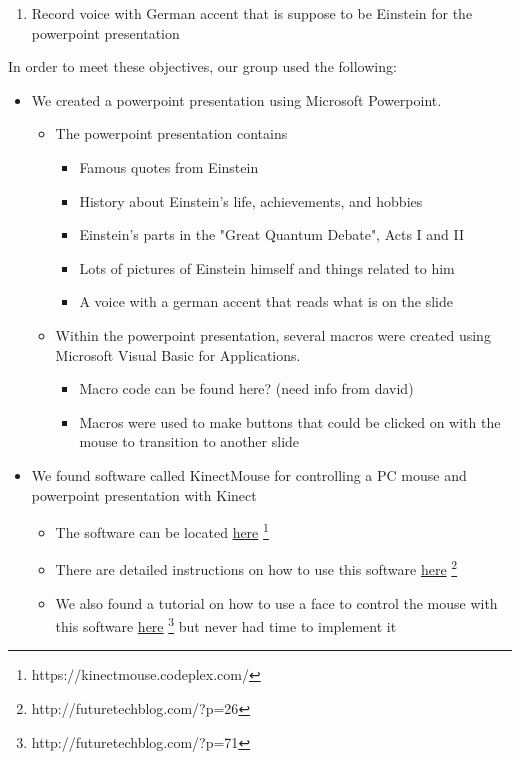 \documentclass[12pt]{article}
\begin{document}
\begin{description}
\begin{enumerate}
			\item Record voice with German accent that is suppose to be Einstein for the powerpoint presentation
		\end{enumerate}
		In order to meet these objectives, our group used the following:
		\begin{itemize}
			\item We created a powerpoint presentation using Microsoft Powerpoint.
				\begin{itemize}
					\item The powerpoint presentation contains
						\begin{itemize}
							\item Famous quotes from Einstein
							\item History about Einstein's life, achievements, and hobbies
							\item Einstein's parts in the "Great Quantum Debate", Acts I and II
							\item Lots of pictures of Einstein himself and things related to him
							\item A voice with a german accent that reads what is on the slide
						\end{itemize}
					\item Within the powerpoint presentation, several macros were created using Microsoft Visual Basic for Applications.
						\begin{itemize}
							\item Macro code can be found here? (need info from david)
							\item Macros were used to make buttons that could be clicked on with the mouse to transition to another slide
						\end{itemize}
				\end{itemize}
			\item We found software called KinectMouse for controlling a PC mouse and powerpoint presentation with Kinect
				\begin{itemize}
					\item The software can be located \href{https://kinectmouse.codeplex.com/}{here} \footnote{https://kinectmouse.codeplex.com/}
					\item There are detailed instructions on how to use this software \href{http://futuretechblog.com/?p=26}{here} \footnote{http://futuretechblog.com/?p=26}
					\item We also found a tutorial on how to use a face to control the mouse with this software \href{http://futuretechblog.com/?p=71}{here} \footnote{http://futuretechblog.com/?p=71} but never had time to implement it

\end{itemize}
\end{itemize}
\end{description}
\end{document}
